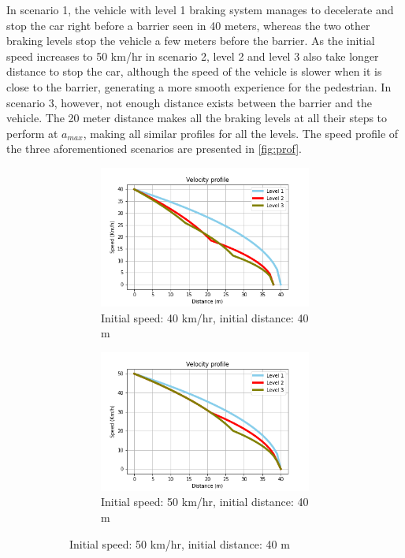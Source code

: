 In scenario 1, the vehicle with level 1 braking system manages to decelerate and stop the car right before a barrier seen in 40 meters, whereas the two other braking levels stop the vehicle a few meters before the barrier. As the initial speed increases to 50 km/hr in scenario 2, level 2 and level 3 also take longer distance to stop the car, although the speed of the vehicle is slower when it is close to the barrier, generating a more smooth experience for the pedestrian. In scenario 3, however, not enough distance exists between the barrier and the vehicle. The 20 meter distance makes all the braking levels at all their steps to perform at $a_{max}$, making all similar profiles for all the levels. The speed profile of the three aforementioned scenarios are presented in \cref{fig:prof}.
\begin{figure}[!t]
\begin{adjustbox}{varwidth=\textwidth,fbox,center}
\centering
\begin{subfigure}{0.95\linewidth}

    \begin{subfigure}[b]{0.45\textwidth}
         \centering
         \includegraphics[scale=0.4]{appendix/figures/r40_40.png}
         \caption{Initial speed: 40 km/hr, initial distance: 40 m}
     \end{subfigure}
     \hfill
     \begin{subfigure}[b]{0.45\textwidth}
         \centering
         \includegraphics[scale=0.4]{appendix/figures/r40_50.png}
         \caption{Initial speed: 50 km/hr, initial distance: 40 m}
     \end{subfigure}
\end{subfigure}\\[2ex]
\begin{subfigure}{0.8\linewidth}


\end{subfigure}
\end{adjustbox}
\end{figure}
